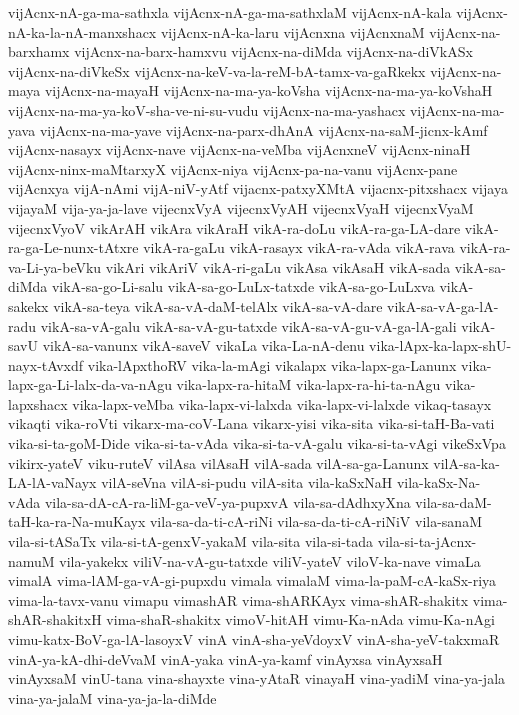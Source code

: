 {vijAcnx-nA-ga-ma-sathxla
vijAcnx-nA-ga-ma-sathxlaM
vijAcnx-nA-kala
vijAcnx-nA-ka-la-nA-manxshacx
vijAcnx-nA-ka-laru
vijAcnxna
vijAcnxnaM
vijAcnx-na-barxhamx
vijAcnx-na-barx-hamxvu
vijAcnx-na-diMda
vijAcnx-na-diVkASx
vijAcnx-na-diVkeSx
vijAcnx-na-keV-va-la-reM-bA-tamx-va-gaRkekx
vijAcnx-na-maya
vijAcnx-na-mayaH
vijAcnx-na-ma-ya-koVsha
vijAcnx-na-ma-ya-koVshaH
vijAcnx-na-ma-ya-koV-sha-ve-ni-su-vudu
vijAcnx-na-ma-yashacx
vijAcnx-na-ma-yava
vijAcnx-na-ma-yave
vijAcnx-na-parx-dhAnA
vijAcnx-na-saM-jicnx-kAmf
vijAcnx-nasayx
vijAcnx-nave
vijAcnx-na-veMba
vijAcnxneV
vijAcnx-ninaH
vijAcnx-ninx-maMtarxyX
vijAcnx-niya
vijAcnx-pa-na-vanu
vijAcnx-pane
vijAcnxya
vijA-nAmi
vijA-niV-yAtf
vijacnx-patxyXMtA
vijacnx-pitxshacx
vijaya
vijayaM
vija-ya-ja-lave
vijecnxVyA
vijecnxVyAH
vijecnxVyaH
vijecnxVyaM
vijecnxVyoV
vikArAH
vikAra
vikAraH
vikA-ra-doLu
vikA-ra-ga-LA-dare
vikA-ra-ga-Le-nunx-tAtxre
vikA-ra-gaLu
vikA-rasayx
vikA-ra-vAda
vikA-rava
vikA-ra-va-Li-ya-beVku
vikAri
vikAriV
vikA-ri-gaLu
vikAsa
vikAsaH
vikA-sada
vikA-sa-diMda
vikA-sa-go-Li-salu
vikA-sa-go-LuLx-tatxde
vikA-sa-go-LuLxva
vikA-sakekx
vikA-sa-teya
vikA-sa-vA-daM-telAlx
vikA-sa-vA-dare
vikA-sa-vA-ga-lA-radu
vikA-sa-vA-galu
vikA-sa-vA-gu-tatxde
vikA-sa-vA-gu-vA-ga-lA-gali
vikA-savU
vikA-sa-vanunx
vikA-saveV
vikaLa
vika-La-nA-denu
vika-lApx-ka-lapx-shU-nayx-tAvxdf
vika-lApxthoRV
vika-la-mAgi
vikalapx
vika-lapx-ga-Lanunx
vika-lapx-ga-Li-lalx-da-va-nAgu
vika-lapx-ra-hitaM
vika-lapx-ra-hi-ta-nAgu
vika-lapxshacx
vika-lapx-veMba
vika-lapx-vi-lalxda
vika-lapx-vi-lalxde
vikaq-tasayx
vikaqti
vika-roVti
vikarx-ma-coV-Lana
vikarx-yisi
vika-sita
vika-si-taH-Ba-vati
vika-si-ta-goM-Dide
vika-si-ta-vAda
vika-si-ta-vA-galu
vika-si-ta-vAgi
vikeSxVpa
vikirx-yateV
viku-ruteV
vilAsa
vilAsaH
vilA-sada
vilA-sa-ga-Lanunx
vilA-sa-ka-LA-lA-vaNayx
vilA-seVna
vilA-si-pudu
vilA-sita
vila-kaSxNaH
vila-kaSx-Na-vAda
vila-sa-dA-cA-ra-liM-ga-veV-ya-pupxvA
vila-sa-dAdhxyXna
vila-sa-daM-taH-ka-ra-Na-muKayx
vila-sa-da-ti-cA-riNi
vila-sa-da-ti-cA-riNiV
vila-sanaM
vila-si-tASaTx
vila-si-tA-genxV-yakaM
vila-sita
vila-si-tada
vila-si-ta-jAcnx-namuM
vila-yakekx
viliV-na-vA-gu-tatxde
viliV-yateV
viloV-ka-nave
vimaLa
vimalA
vima-lAM-ga-vA-gi-pupxdu
vimala
vimalaM
vima-la-paM-cA-kaSx-riya
vima-la-tavx-vanu
vimapu
vimashAR
vima-shARKAyx
vima-shAR-shakitx
vima-shAR-shakitxH
vima-shaR-shakitx
vimoV-hitAH
vimu-Ka-nAda
vimu-Ka-nAgi
vimu-katx-BoV-ga-lA-lasoyxV
vinA
vinA-sha-yeVdoyxV
vinA-sha-yeV-takxmaR
vinA-ya-kA-dhi-deVvaM
vinA-yaka
vinA-ya-kamf
vinAyxsa
vinAyxsaH
vinAyxsaM
vinU-tana
vina-shayxte
vina-yAtaR
vinayaH
vina-yadiM
vina-ya-jala
vina-ya-jalaM
vina-ya-ja-la-diMde
}
